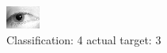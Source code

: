 \begin{figure}[h!]
\begin{center}
\includegraphics[width=0.60\columnwidth]{figures/ID1291_class_4_target_3.png}
\end{center}
\caption{ Classification: 4 actual target: 3}
\label{fig:ID1291_class_4_target_3}
\end{figure}
